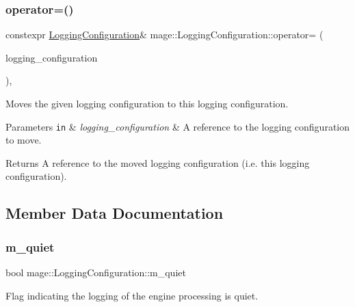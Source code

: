 \subsubsection{\texorpdfstring{operator=()}{operator=()}\hspace{0.1cm}{\footnotesize\ttfamily [2/2]}}
{\footnotesize\ttfamily constexpr \hyperlink{classmage_1_1_logging_configuration}{Logging\+Configuration}\& mage\+::\+Logging\+Configuration\+::operator= (\begin{DoxyParamCaption}\item[{\hyperlink{classmage_1_1_logging_configuration}{Logging\+Configuration} \&\&}]{logging\+\_\+configuration }\end{DoxyParamCaption})\hspace{0.3cm}{\ttfamily [default]}, {\ttfamily [noexcept]}}

Moves the given logging configuration to this logging configuration.


\begin{DoxyParams}[1]{Parameters}
\mbox{\tt in}  & {\em logging\+\_\+configuration} & A reference to the logging configuration to move. \\
\hline
\end{DoxyParams}
\begin{DoxyReturn}{Returns}
A reference to the moved logging configuration (i.\+e. this logging configuration). 
\end{DoxyReturn}


\subsection{Member Data Documentation}
\hypertarget{classmage_1_1_logging_configuration_a38f457d5db84d15e008841ca8653b47c}{}\label{classmage_1_1_logging_configuration_a38f457d5db84d15e008841ca8653b47c} 
\subsubsection{\texorpdfstring{m\+\_\+quiet}{m\_quiet}}
{\footnotesize\ttfamily bool mage\+::\+Logging\+Configuration\+::m\+\_\+quiet\hspace{0.3cm}{\ttfamily [private]}}

Flag indicating the logging of the engine processing is quiet. \hypertarget{classmage_1_1_logging_configuration_a60f052c2bb702d8153188e93f00427ac}{}\label{classmage_1_1_logging_configuration_a60f052c2bb702d8153188e93f00427ac} 
